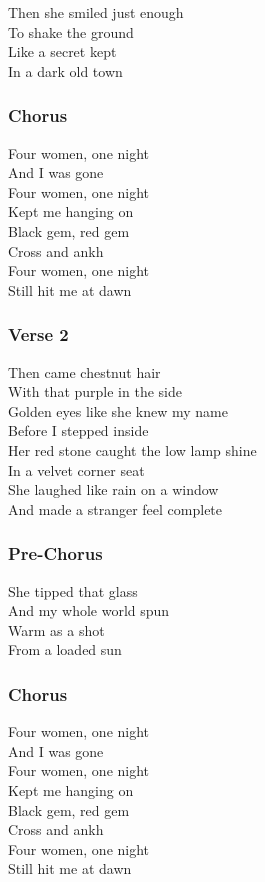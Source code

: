 Then she smiled just enough\\
To shake the ground\\
Like a secret kept\\
In a dark old town

\subsubsection{Chorus}\label{chorus-36}

Four women, one night\\
And I was gone\\
Four women, one night\\
Kept me hanging on\\
Black gem, red gem\\
Cross and ankh\\
Four women, one night\\
Still hit me at dawn

\subsubsection{Verse 2}\label{verse-2-13}

Then came chestnut hair\\
With that purple in the side\\
Golden eyes like she knew my name\\
Before I stepped inside\\
Her red stone caught the low lamp shine\\
In a velvet corner seat\\
She laughed like rain on a window\\
And made a stranger feel complete

\subsubsection{Pre-Chorus}\label{pre-chorus-17}

She tipped that glass\\
And my whole world spun\\
Warm as a shot\\
From a loaded sun

\subsubsection{Chorus}\label{chorus-37}

Four women, one night\\
And I was gone\\
Four women, one night\\
Kept me hanging on\\
Black gem, red gem\\
Cross and ankh\\
Four women, one night\\
Still hit me at dawn

